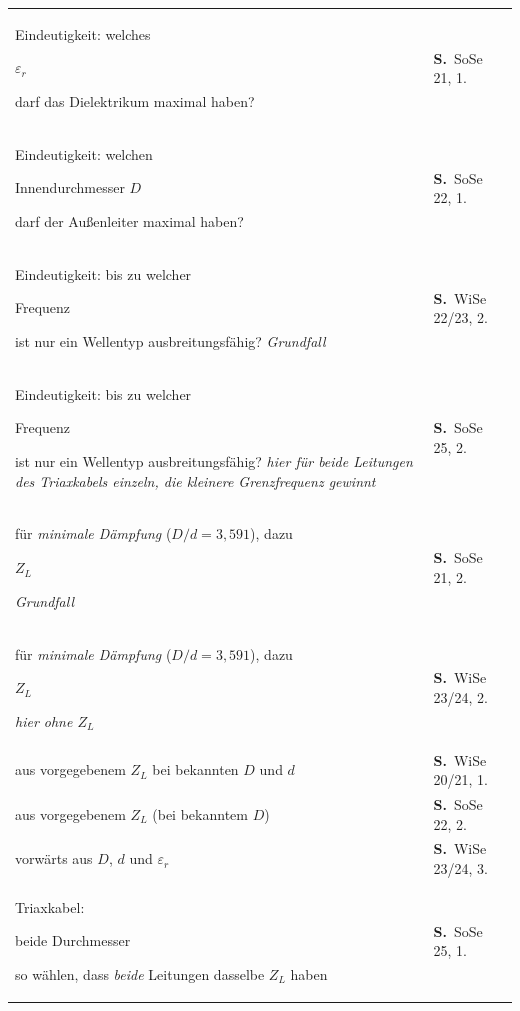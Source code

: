 \documentclass[a4paper,10pt]{article}
\newcommand{\gs}[1]{{\setlength{\fboxsep}{0.5mm}%
  \colorbox{MarkerG!45}{\strut #1}}}
\begin{document}
\begin{tabularx}{\textwidth}{@{}>{\RaggedRight}X>{\RaggedRight\scriptsize}p{27mm}@{}}
\hline\rule{0pt}{3.5mm}
Eindeutigkeit: welches \gs{$\varepsilon_r$} darf das Dielektrikum maximal haben? & \textbf{S.\,\pageref{tf:SoSe21:1:1}} \textcolor{Grau}{SoSe 21, 1.} \\
Eindeutigkeit: welchen \gs{Innendurchmesser $D$} darf der Außenleiter maximal haben? & \textbf{S.\,\pageref{tf:SoSe22:1:1}} \textcolor{Grau}{SoSe 22, 1.} \\
Eindeutigkeit: bis zu welcher \gs{Frequenz} ist nur ein Wellentyp ausbreitungsfähig? \newline \hspace*{3mm}\textcolor{Grau}{\itshape \textendash{} Grundfall} & \textbf{S.\,\pageref{tf:WiSe22x23:1:2}} \textcolor{Grau}{WiSe 22/23, 2.} \\
Eindeutigkeit: bis zu welcher \gs{Frequenz} ist nur ein Wellentyp ausbreitungsfähig? \newline \hspace*{3mm}\textcolor{Grau}{\itshape \textendash{} hier für \emph{beide} Leitungen des Triaxkabels einzeln, die kleinere Grenzfrequenz gewinnt} & \textbf{S.\,\pageref{tf:SoSe25:1:2}} \textcolor{Grau}{SoSe 25, 2.} \\
\gs{Innenleiter-Durchmesser $d$} für \emph{minimale Dämpfung} ($D/d=3{,}591$), dazu \gs{$Z_L$} \newline \hspace*{3mm}\textcolor{Grau}{\itshape \textendash{} Grundfall} & \textbf{S.\,\pageref{tf:SoSe21:1:2}} \textcolor{Grau}{SoSe 21, 2.} \\
\gs{Innenleiter-Durchmesser $d$} für \emph{minimale Dämpfung} ($D/d=3{,}591$), dazu \gs{$Z_L$} \newline \hspace*{3mm}\textcolor{Grau}{\itshape \textendash{} hier ohne $Z_L$} & \textbf{S.\,\pageref{tf:WiSe23x24:1:2}} \textcolor{Grau}{WiSe 23/24, 2.} \\
\gs{$\varepsilon_r$} aus vorgegebenem $Z_L$ bei bekannten $D$ und $d$ & \textbf{S.\,\pageref{tf:WiSe20x21:1:1}} \textcolor{Grau}{WiSe 20/21, 1.} \\
\gs{$d$} aus vorgegebenem $Z_L$ (bei bekanntem $D$) & \textbf{S.\,\pageref{tf:SoSe22:1:2}} \textcolor{Grau}{SoSe 22, 2.} \\
\gs{$Z_L$} vorwärts aus $D$, $d$ und $\varepsilon_r$ & \textbf{S.\,\pageref{tf:WiSe23x24:1:3}} \textcolor{Grau}{WiSe 23/24, 3.} \\
Triaxkabel: \gs{beide Durchmesser} so wählen, dass \emph{beide} Leitungen dasselbe $Z_L$ haben & \textbf{S.\,\pageref{tf:SoSe25:1:1}} \textcolor{Grau}{SoSe 25, 1.} \\

\end{tabularx}
\end{document}
